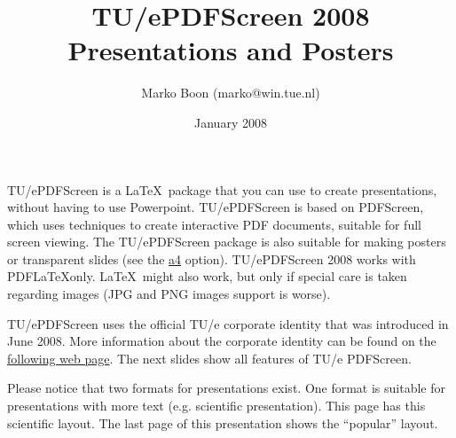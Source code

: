 \documentclass[a4paper]{article}            %
\title{TU/ePDFScreen 2008\\\huge Presentations and Posters}                  %
\author{Marko Boon ({marko@win.tue.nl})}  %
\date{January 2008}  %
\begin{document}
\begin{titleslide}
\end{titleslide}

\begin{slidetop}
\tableofcontents
\end{slidetop}

\begin{slidetop}

TU/ePDFScreen is a \LaTeX\ package that you can use to create presentations, without having to use Powerpoint. TU/ePDFScreen is based on PDFScreen, which uses techniques to create interactive PDF documents, suitable for full screen viewing. The TU/ePDFScreen package is also suitable for making posters or transparent slides (see the \hyperlink{A4}{a4} option). TU/ePDFScreen 2008 works with PDF\LaTeX only. \LaTeX\ might also work, but only if special care is taken regarding images (JPG and PNG images support is worse).
\end{slidetop}

\begin{slidetop}

TU/ePDFScreen uses the official TU/e corporate identity that was introduced in June 2008. More information about the corporate identity can be found on the \href{http://w3.tue.nl/en/services/cec/corporate_communicatie/corporate_identity/}{following web page}. The next slides show all features of TU/e PDFScreen.

Please notice that two formats for presentations exist. One format is suitable for presentations with more text (e.g. scientific presentation). This page has this scientific layout. The last page of this presentation shows the ``popular'' layout.
\end{slidetop}
\end{document}
